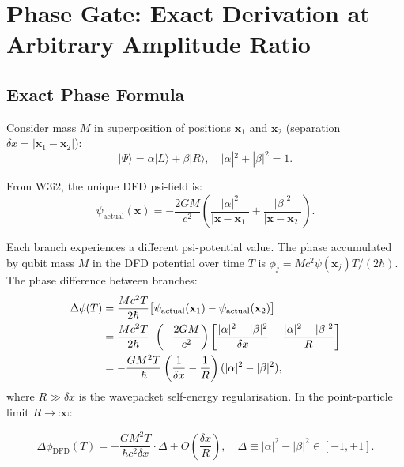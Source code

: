 \documentclass[11pt]{article}
\theoremstyle{definition}
\theoremstyle{remark}
\begin{document}
\section{Phase Gate: Exact Derivation at Arbitrary Amplitude Ratio}
\label{sec:phase-gate}

\subsection{Exact Phase Formula}

Consider mass $M$ in superposition of positions $\mathbf{x}_1$ and
$\mathbf{x}_2$ (separation $\delta x = |\mathbf{x}_1-\mathbf{x}_2|$):
\begin{equation}
  |\Psi\rangle = \alpha|L\rangle + \beta|R\rangle, \quad
  |\alpha|^2 + |\beta|^2 = 1.
\end{equation}

From W3i2, the unique DFD psi-field is:
\begin{equation}
  \psi_{\mathrm{actual}}(\mathbf{x}) = -\frac{2GM}{c^2}\left(
  \frac{|\alpha|^2}{|\mathbf{x}-\mathbf{x}_1|}
  + \frac{|\beta|^2}{|\mathbf{x}-\mathbf{x}_2|}
  \right). \label{eq:psi-actual}
\end{equation}

Each branch experiences a different psi-potential value.  The phase
accumulated by qubit mass $M$ in the DFD potential over time $T$ is
$\phi_j = Mc^2\psi(\mathbf{x}_j)T/(2\hbar)$.  The phase difference
between branches:
\begin{align}
  \Delta\phi(T) &= \frac{Mc^2T}{2\hbar}
  \bigl[\psi_{\mathrm{actual}}(\mathbf{x}_1) - \psi_{\mathrm{actual}}(\mathbf{x}_2)\bigr]
  \notag\\
  &= \frac{Mc^2T}{2\hbar}\cdot\!\left(-\frac{2GM}{c^2}\right)
  \left[\frac{|\alpha|^2-|\beta|^2}{\delta x} - \frac{|\alpha|^2-|\beta|^2}{R}\right]
  \notag\\
  &= -\frac{GM^2T}{\hbar}\left(\frac{1}{\delta x}-\frac{1}{R}\right)(|\alpha|^2-|\beta|^2),
  \label{eq:phase-diff-full}
\end{align}
where $R\gg\delta x$ is the wavepacket self-energy regularisation.
In the point-particle limit $R\to\infty$:

\begin{equation}
  \boxed{
  \Delta\phi_{\mathrm{DFD}}(T) = -\frac{GM^2T}{\hbar c^2\delta x}
  \cdot\Delta + O\!\left(\frac{\delta x}{R}\right),
  \quad \Delta \equiv |\alpha|^2 - |\beta|^2 \in [-1,+1].
  }\label{eq:phase-gate-exact}
\end{equation}
\end{document}
